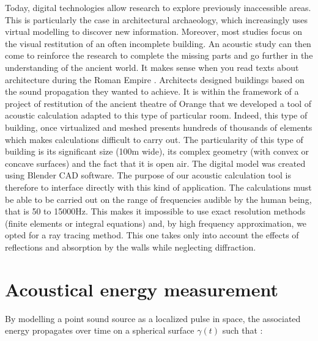 \documentclass[AMA,STIX1COL]{WileyNJD-v2}
\begin{document}
Today, digital technologies allow research to explore previously inaccessible areas. This is particularly the case in architectural archaeology, which increasingly uses virtual modelling to discover new information. Moreover, most studies focus on the visual restitution of an often incomplete building. An acoustic study can then come to reinforce the research to complete the missing parts and go further in the understanding of the ancient world. It makes sense when you read texts about architecture during the Roman Empire \cite{vitruve}. Architects designed buildings based on the sound propagation they wanted to achieve. 
It is within the framework of a project of restitution of the ancient theatre of Orange that we developed a tool of acoustic calculation adapted to this type of particular room. Indeed, this type of building, once virtualized and meshed presents hundreds of thousands of elements which makes calculations difficult to carry out. The particularity of this type of building is its significant size (100m wide), its complex geometry (with convex or concave surfaces) and the fact that it is open air. The digital model was created using Blender CAD software. The purpose of our acoustic calculation tool is therefore to interface directly with this kind of application. The calculations must be able to be carried out on the range of frequencies audible by the human being, that is 50 to 15000Hz. This makes it impossible to use exact resolution methods (finite elements or integral equations) and, by high frequency approximation, we opted for a ray tracing method. This one takes only into account the effects of reflections and absorption by the walls while neglecting diffraction.



%




\section{Acoustical energy measurement}\label{sec2}


By modelling a point sound source as a localized pulse in space, the associated energy propagates over time on a spherical surface $\gamma(t)$ such that :
\end{document}
